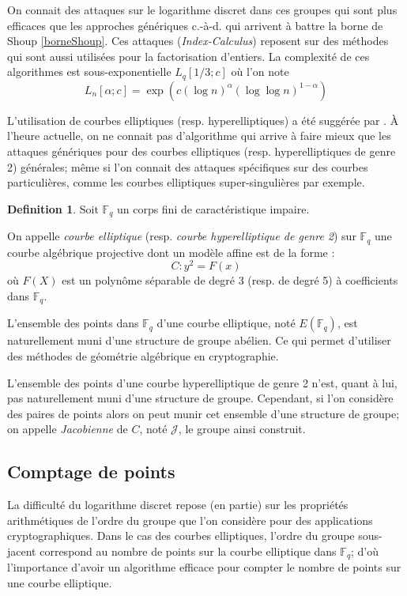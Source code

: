 \documentclass[a4paper,12pt]{article}
\theoremstyle{definition}
\newtheorem{definition}{Definition}[section]
\theoremstyle{remark}
\numberwithin{equation}{section}
\begin{document}
On connait des attaques sur le logarithme discret dans ces groupes qui sont plus efficaces que les approches génériques c.-à-d. qui arrivent à battre la borne de Shoup \ref{borneShoup}. Ces attaques (\emph{Index-Calculus}) reposent sur des méthodes qui sont aussi utilisées pour la factorisation d'entiers. La complexité de ces algorithmes est sous-exponentielle $L_q[1/3;c]$ où l'on note
$$L_n[\alpha;c] = \exp(c(\log n)^\alpha(\log \log n)^{1-\alpha})$$

L'utilisation de courbes elliptiques (resp. hyperelliptiques) a été suggérée par \citet{koblitz1,koblitz2}. À l'heure actuelle, on ne connait pas d'algorithme qui arrive à faire mieux que les attaques génériques pour des courbes elliptiques (resp. hyperelliptiques de genre 2) générales; même si l'on connait des attaques spécifiques sur des courbes particulières, comme les courbes elliptiques super-singulières par exemple.

\begin{definition}
Soit $\mathbb{F}_q$ un corps fini de caractéristique impaire.

On appelle \emph{courbe elliptique} (resp. \emph{courbe hyperelliptique de genre 2}) sur $\mathbb{F}_q$ une courbe algébrique projective dont un modèle affine est de la forme :
$$C : y^2 = F(x)$$
où $F(X)$ est un polynôme séparable de degré 3 (resp. de degré 5) à coefficients dans $\mathbb{F}_q$.
\end{definition}

L'ensemble des points dans $\mathbb{F}_q$ d'une courbe elliptique, noté $E(\mathbb{F}_q)$, est naturellement muni d'une structure de groupe abélien. Ce qui permet d'utiliser des méthodes de géométrie algébrique en cryptographie.

L'ensemble des points d'une courbe hyperelliptique de genre 2 n'est, quant à lui, pas naturellement muni d'une structure de groupe. Cependant, si l'on considère des paires de points alors on peut munir cet ensemble d'une structure de groupe; on appelle \emph{Jacobienne} de $C$, noté $\mathcal{J}$, le groupe ainsi construit.

\subsection{Comptage de points}
La difficulté du logarithme discret repose (en partie) sur les propriétés arithmétiques de l'ordre du groupe que l'on considère pour des applications cryptographiques. Dans le cas des courbes elliptiques, l'ordre du groupe sous-jacent correspond au nombre de points sur la courbe elliptique dans $\mathbb{F}_q$; d'où l'importance d'avoir un algorithme efficace pour compter le nombre de points sur une courbe elliptique.
\end{document}
